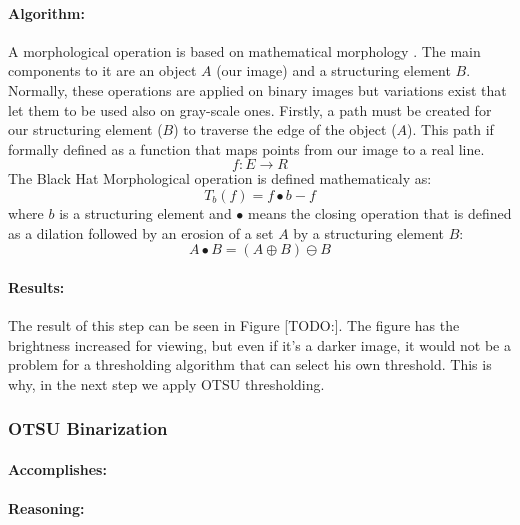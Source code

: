 \paragraph*{Algorithm:}\mbox{}\par
A morphological operation is based on mathematical morphology \cite{article:mathematical-morphology}. The main components to it are an object $A$ (our image) and a structuring element $B$. Normally, these operations are applied on binary images but variations exist that let them to be used also on gray-scale ones. Firstly, a path must be created for our structuring element ($B$) to traverse the edge of the object ($A$). This path if formally defined as a function that maps points from our image to a real line.
\[f:E \rightarrow R\]
The Black Hat Morphological operation is defined mathematicaly as:
\[T_b(f) = f \bullet b - f\]
where $b$ is a structuring element and $\bullet$ means the closing operation that is defined as a dilation followed by an erosion of a set $A$ by a structuring element $B$:
\[A \bullet B = (A \oplus B) \ominus B\]

\paragraph*{Results:}\mbox{}\par
The result of this step can be seen in Figure [TODO:]. The figure has the brightness increased for viewing, but even if it's a darker image, it would not be a problem for a thresholding algorithm that can select his own threshold. This is why, in the next step we apply OTSU thresholding.

\subsubsection{OTSU Binarization}
\label{subsubsec:OTSU-binarization}

\paragraph*{Accomplishes:}\mbox{}\par

\paragraph*{Reasoning:}\mbox{}\par

